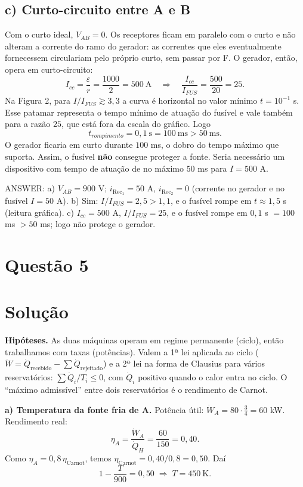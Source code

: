 \documentclass{article}%
\begin{document}
\subsection*{c) Curto-circuito entre A e B}

Com o curto ideal, $V_{AB}=0$. Os receptores ficam em paralelo com o curto e não alteram a corrente do ramo do gerador: as correntes que eles eventualmente fornecessem circulariam pelo próprio curto, sem passar por F. O gerador, então, opera em curto-circuito:
\[
I_{cc}=\frac{\varepsilon}{r}=\frac{1000}{2}=500\ \text{A}\quad\Rightarrow\quad \frac{I_{cc}}{I_{FUS}}=\frac{500}{20}=25 .
\]
Na Figura 2, para $I/I_{FUS}\gtrsim 3{,}3$ a curva é horizontal no valor mínimo $t=10^{-1}$ s. Esse patamar representa o tempo mínimo de atuação do fusível e vale também para a razão $25$, que está fora da escala do gráfico. Logo
\[
t_{rompimento}=0{,}1\ \text{s}=100\ \text{ms}>50\ \text{ms}.
\]
O gerador ficaria em curto durante $100$ ms, o dobro do tempo máximo que suporta. Assim, o fusível \textbf{não} consegue proteger a fonte. Seria necessário um dispositivo com tempo de atuação de no máximo $50$ ms para $I=500$ A.

ANSWER: a) $V_{AB}=900$ V; $i_{\text{Rec}_1}=50$ A, $i_{\text{Rec}_2}=0$ (corrente no gerador e no fusível $I=50$ A). b) Sim: $I/I_{FUS}=2{,}5>1{,}1$, e o fusível rompe em $t\approx 1{,}5$ s (leitura gráfica). c) $I_{cc}=500$ A, $I/I_{FUS}=25$, e o fusível rompe em $0{,}1$ s $=100$ ms $>50$ ms; logo não protege o gerador.%
\newpage%
\section*{Questão 5}

\section*{Solução}

\textbf{Hipóteses.} As duas máquinas operam em regime permanente (ciclo), então trabalhamos com taxas (potências). Valem a 1ª lei aplicada ao ciclo ($\dot W=\dot Q_{\text{recebido}}-\sum\dot Q_{\text{rejeitado}}$) e a 2ª lei na forma de Clausius para vários reservatórios: $\sum \dot Q_i/T_i\le 0$, com $\dot Q_i$ positivo quando o calor entra no ciclo. O ``máximo admissível'' entre dois reservatórios é o rendimento de Carnot.

\medskip
\textbf{a) Temperatura da fonte fria de A.}
Potência útil: $\dot W_A=80\cdot\tfrac34=60$ kW. Rendimento real:
\[
\eta_A=\frac{\dot W_A}{\dot Q_H}=\frac{60}{150}=0{,}40 .
\]
Como $\eta_A=0{,}8\,\eta_{\text{Carnot}}$, temos $\eta_{\text{Carnot}}=0{,}40/0{,}8=0{,}50$. Daí
\[
1-\frac{T}{900}=0{,}50\;\Longrightarrow\; T=450\ \text{K}.
\]
\end{document}
